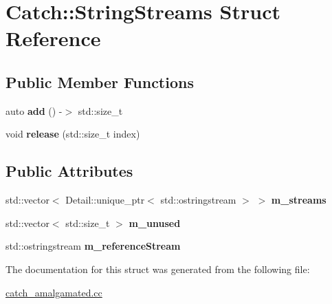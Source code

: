 \hypertarget{structCatch_1_1StringStreams}{}\section{Catch\+:\+:String\+Streams Struct Reference}
\label{structCatch_1_1StringStreams}
\subsection*{Public Member Functions}
\begin{DoxyCompactItemize}
\item 
\mbox{\label{structCatch_1_1StringStreams_a1e98cd696f9e141b3a89f305af962d91}} 
auto {\bfseries add} () -\/$>$ std\+::size\+\_\+t
\item 
\mbox{\label{structCatch_1_1StringStreams_a7e746fe736750cd67389883f6787a9b7}} 
void {\bfseries release} (std\+::size\+\_\+t index)
\end{DoxyCompactItemize}
\subsection*{Public Attributes}
\begin{DoxyCompactItemize}
\item 
\mbox{\label{structCatch_1_1StringStreams_a12e806f1886bc1d2ea8e29c13a9b38ca}} 
std\+::vector$<$ Detail\+::unique\+\_\+ptr$<$ std\+::ostringstream $>$ $>$ {\bfseries m\+\_\+streams}
\item 
\mbox{\label{structCatch_1_1StringStreams_a6c04fb72aa5c9eb66af33a56857f996f}} 
std\+::vector$<$ std\+::size\+\_\+t $>$ {\bfseries m\+\_\+unused}
\item 
\mbox{\label{structCatch_1_1StringStreams_a3eee987f15e8bd678b751cf0a1702a03}} 
std\+::ostringstream {\bfseries m\+\_\+reference\+Stream}
\end{DoxyCompactItemize}


The documentation for this struct was generated from the following file\+:\begin{DoxyCompactItemize}
\item 
\hyperlink{catch__amalgamated_8cc}{catch\+\_\+amalgamated.\+cc}\end{DoxyCompactItemize}
